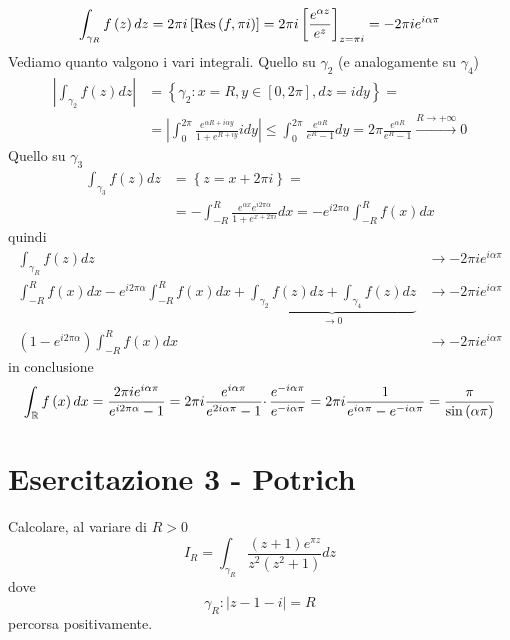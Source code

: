 \FloatBarrier

\begin{equation*}
\int _{\gamma _{R}} f\left( z\right) dz=2\pi i\left[\operatorname{Res} \left( f,\pi i\right)\right] =2\pi i\left[\frac{e^{\alpha z}}{e^{z}}\right]_{z=\pi i} =-2\pi ie^{i\alpha \pi }
\end{equation*}
Vediamo quanto valgono i vari integrali. Quello su $\gamma _{2}$ (e analogamente su $\gamma _{4}$)
\begin{align*}
\left| \int _{\gamma _{2}} f\left( z\right) dz\right|  & =\left\{\gamma _{2} :x=R,y\in \left[ 0,2\pi \right] ,dz=idy\right\} =\\
 & =\left| \int ^{2\pi }_{0}\frac{e^{\alpha R+i\alpha y}}{1+e^{R+iy}} idy\right| \leqslant \int ^{2\pi }_{0}\frac{e^{\alpha R}}{e^{R} -1} dy=2\pi \frac{e^{\alpha R}}{e^{R} -1}\xrightarrow{R\rightarrow +\infty } 0
\end{align*}
Quello su $\gamma _{3}$
\begin{align*}
\int _{\gamma _{3}} f\left( z\right) dz & =\left\{z=x+2\pi i\right\} =\\
 & =-\int ^{R}_{-R}\frac{e^{\alpha x} e^{i2\pi \alpha }}{1+e^{x+2\pi i}} dx=-e^{i2\pi \alpha }\int ^{R}_{-R} f\left( x\right) dx
\end{align*}
quindi
\begin{align*}
\int _{\gamma _{R}} f\left( z\right) dz & \rightarrow -2\pi ie^{i\alpha \pi }\\
\int ^{R}_{-R} f\left( x\right) dx-e^{i2\pi \alpha }\int ^{R}_{-R} f\left( x\right) dx+\underbrace{\int _{\gamma _{2}} f\left( z\right) dz+\int _{\gamma _{4}} f\left( z\right) dz}_{\rightarrow 0} & \rightarrow -2\pi ie^{i\alpha \pi }\\
\left( 1-e^{i2\pi \alpha }\right)\int ^{R}_{-R} f\left( x\right) dx & \rightarrow -2\pi ie^{i\alpha \pi }
\end{align*}
in conclusione
\begin{equation*}
\int _{\mathbb{R} } f\left( x\right) dx=\frac{2\pi ie^{i\alpha \pi }}{e^{i2\pi \alpha } -1} =2\pi i\frac{e^{i\alpha \pi }}{e^{2i\alpha \pi } -1} \cdotp \frac{e^{-i\alpha \pi }}{e^{-i\alpha \pi }} =2\pi i\frac{1}{e^{i\alpha \pi } -e^{-i\alpha \pi }} =\frac{\pi }{\sin\left( \alpha \pi \right)}
\end{equation*}
\chapter{Esercitazione 3 - Potrich}
\ParteEsercizi
\Esercizio{}

Calcolare, al variare di $R >0$
\begin{equation*}
I_{R} =\int _{\gamma _{R}}\frac{\left( z+1\right) e^{\pi z}}{z^{2}\left( z^{2} +1\right)} dz
\end{equation*}
dove
\begin{equation*}
\gamma _{R} :\left| z-1-i\right| =R
\end{equation*}
percorsa positivamente.
\Esercizio{}

